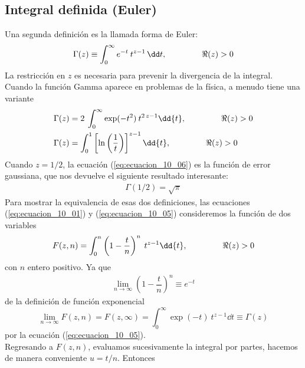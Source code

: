 \subsection{Integral definida (Euler)}

Una segunda definición es la llamada forma de Euler:
\begin{align}
\Gamma (z) \equiv \int_{0}^{\infty} e^{-t} \: t^{z - 1} \, \dd t, \hspace{1.5cm} \Re(z) > 0
\label{eq:ecuacion_10_05}
\end{align}
La restricción en $z$ es necesaria para prevenir la divergencia de la integral. Cuando la función Gamma aparece en problemas de la física, a menudo tiene una variante
\begin{align}
\Gamma (z) &= 2 \: \int_{0}^{\infty} \exp(-t^{2}) \: t^{2 \, z - 1} \dd{t}, \hspace{1.5cm} \Re(z) > 0  \label{eq:ecuacion_10_06} \\
\Gamma (z) &=  \int_{0}^{1} \left[ \ln\left(\dfrac{1}{t} \right) \right]^{z - 1} \dd{t}, \hspace{1.5cm} \Re (z) > 0 \label{eq:ecuacion_10_07}
\end{align}
Cuando $z=1/2$, la ecuación (\ref{eq:ecuacion_10_06}) es la función de error gaussiana, que nos devuelve el siguiente resultado interesante:
\begin{align}
\Gamma (1/2) = \sqrt{\pi}
\label{eq:ecuacion_10_08}
\end{align}
Para mostrar la equivalencia de esas dos definiciones, las ecuaciones (\ref{eq:ecuacion_10_01}) y (\ref{eq:ecuacion_10_05}) consideremos la función de dos variables
\begin{align}
F(z, n) = \int_{0}^{n} \left( 1 - \dfrac{t}{n} \right)^{n} \: t^{z - 1} \dd{t}, \hspace{1.5cm} \Re(z) > 0
\label{eq:ecuacion_10_09}
\end{align}
con $n$ entero positivo. Ya que
\begin{align}
\lim_{n \to \infty} \left( 1 - \dfrac{t}{n} \right)^{n} \equiv e^{-t}
\label{eq:ecuacion_10_10}
\end{align}
de la definición de función exponencial
\begin{equation}
\lim_{n \to \infty} F(z, n) = F(z, \infty) = \int_{0}^{\infty} \exp(-t) \: t^{z - 1} \dd{t} \equiv \Gamma (z)
\label{eq:ecuacion_10_11}
\end{equation}
por la ecuación (\ref{eq:ecuacion_10_05}).
\\
Regresando a $F(z,n)$, evaluamos sucesivamente la integral por partes, hacemos de manera conveniente $u = t/n$. Entonces
